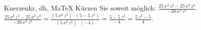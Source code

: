 \begin{MAufgabe}{Kuerzen}{kr, dh, MaTeX}
K\"urzen Sie soweit m\"oglich: $\frac{25\, x^2\, z^2 - 25\, x^2\, z^4}{- 20\, x^2\, z^2}$.\\ 
\ifLsg\MLoesung
\quad $\frac{25\, x^2\, z^2 - 25\, x^2\, z^4}{- 20\, x^2\, z^2}=\frac{(5\, x^2\, z^2)\cdot(5 - 5\, z^2)}{(5\, x^2\, z^2)\cdot(-4)}=\frac{5 - 5\, z^2}{-4}=\frac{5\, z^2 - 5}{4}$.\else\relax\fi
 \end{MAufgabe}